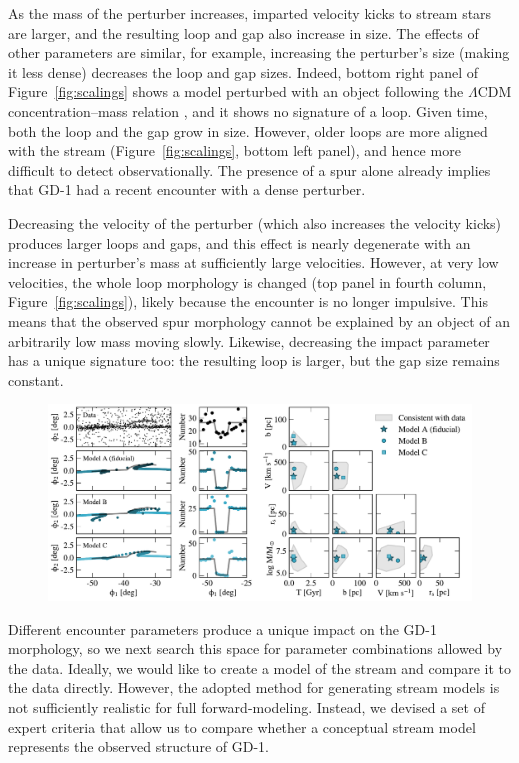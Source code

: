 \documentclass[twocolumn]{aastex62}
\begin{document}
As the mass of the perturber increases, imparted velocity kicks to stream stars are larger, and the resulting loop and gap also increase in size.
The effects of other parameters are similar, for example, increasing the perturber's size (making it less dense) decreases the loop and gap sizes.
Indeed, bottom right panel of Figure~\ref{fig:scalings} shows a model perturbed with an object following the $\Lambda$CDM concentration--mass relation \citep{diemer2018}, and it shows no signature of a loop.
Given time, both the loop and the gap grow in size.
However, older loops are more aligned with the stream (Figure~\ref{fig:scalings}, bottom left panel), and hence more difficult to detect observationally.
The presence of a spur alone already implies that GD-1 had a recent encounter with a dense perturber.

Decreasing the velocity of the perturber (which also increases the velocity kicks) produces larger loops and gaps, and this effect is nearly degenerate with an increase in perturber's mass at sufficiently large velocities.
However, at very low velocities, the whole loop morphology is changed (top panel in fourth column, Figure~\ref{fig:scalings}), likely because the encounter is no longer impulsive.
This means that the observed spur morphology cannot be explained by an object of an arbitrarily low mass moving slowly.
Likewise, decreasing the impact parameter has a unique signature too: the resulting loop is larger, but the gap size remains constant.

\begin{figure}
\begin{center}
\includegraphics[width=\textwidth]{param_search.pdf}
\end{center}
\caption{}
\label{fig:corner}
\end{figure}

Different encounter parameters produce a unique impact on the GD-1 morphology, so we next search this space for parameter combinations allowed by the data.
Ideally, we would like to create a model of the stream and compare it to the data directly.
However, the adopted method for generating stream models is not sufficiently realistic for full forward-modeling.
Instead, we devised a set of expert criteria that allow us to compare whether a conceptual stream model represents the observed structure of GD-1.
\end{document}
